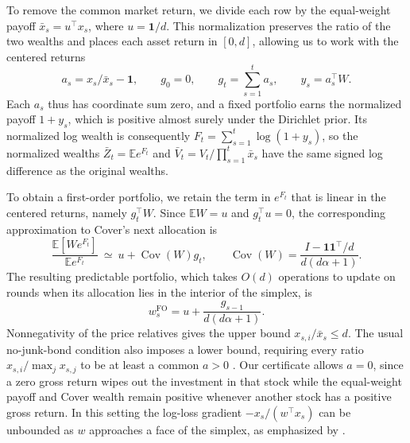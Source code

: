 \documentclass{article}
\numberwithin{equation}{section}
\theoremstyle{remark}
\newcommand{\E}{\mathbb E}
\newcommand{\one}{\mathbf 1}
\DeclareMathOperator{\Cov}{Cov}
\begin{document}
To remove the common market return, we divide each row by the equal-weight
payoff $\bar x_s=u^\top x_s$, where $u=\one/d$. This normalization
preserves the ratio of the two wealths and places each asset return in
$[0,d]$, allowing us to work with the centered returns
\[
 a_s=x_s/\bar x_s-\one,\qquad g_0=0,\qquad
 g_t=\sum_{s=1}^t a_s,\qquad y_s=a_s^\top W .
\]
Each $a_s$ thus has coordinate sum zero, and a fixed portfolio earns the
normalized payoff $1+y_s$, which is positive almost surely under the
Dirichlet prior. Its normalized log wealth is consequently
$F_t=\sum_{s=1}^t\log(1+y_s)$, so the normalized wealths
$\bar Z_t=\E e^{F_t}$ and $\bar V_t=V_t/\prod_{s=1}^t\bar x_s$ have the
same signed log difference as the original wealths.

To obtain a first-order portfolio, we retain the term in $e^{F_t}$ that is
linear in the centered returns, namely $g_t^\top W$. Since $\E W=u$ and
$g_t^\top u=0$, the corresponding approximation to Cover's next allocation is
\[
 \frac{\E[We^{F_t}]}{\E e^{F_t}}
 \ \simeq\ u+\Cov(W)g_t,\qquad
 \Cov(W)=\frac{I-\one\one^\top/d}{d(d\alpha+1)} .
\]
The resulting predictable portfolio, which takes $O(d)$ operations to
update on rounds when its allocation lies in the interior of the simplex, is
\begin{equation}
 w_s^{\mathrm{FO}}=u+\frac{g_{s-1}}{d(d\alpha+1)} .
 \label{eq:first-order}
\end{equation}
Nonnegativity of the price relatives gives the upper bound $x_{s,i}/\bar x_s\le d$.
The usual no-junk-bond condition also imposes a lower bound, requiring
every ratio $x_{s,i}/\max_j x_{s,j}$ to be at least a common $a>0$
\citep[Remark~12 and Theorem~13]{chokvasil2025}. Our certificate allows
$a=0$, since a zero gross return wipes out the investment in that stock
while the equal-weight payoff and Cover wealth remain positive whenever
another stock has a positive gross return. In this setting the log-loss
gradient $-x_s/(w^\top x_s)$ can be unbounded as $w$ approaches a face of
the simplex, as emphasized by \citet{vanerven2020}.
\end{document}
